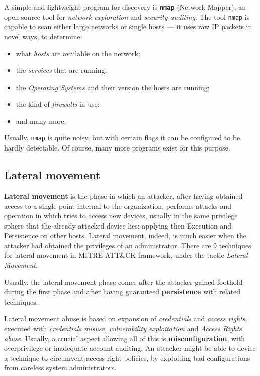\documentclass[10pt]{extreport}
\begin{document}
A simple and lightweight program for discovery is \textbf{\texttt{nmap}}
(Network Mapper), an open source tool for \emph{network exploration} and
\emph{security auditing}. The tool \texttt{nmap} is capable to scan either
large networks or single hosts --- it uses raw IP packets in novel ways, to
determine:
\begin{itemize}
    \item what \emph{hosts} are available on the network;
    \item the \emph{services} that are running;
    \item the \emph{Operating Systems} and their version the hosts are running;
    \item the kind of \emph{firewalls} in use;
    \item and many more.
\end{itemize}

Usually, \texttt{nmap} is quite noisy, but with certain flags it can be
configured to be hardly detectable. Of course, many more programs exist for
this purpose.


\subsection{Lateral movement}

\textbf{Lateral movement} is the phase in which an attacker, after having
obtained access to a single point internal to the organization, performs
attacks and operation in which tries to access new devices, usually in the same
privilege sphere that the already attacked device lies; applying then Execution
and Persistence on other hosts. Lateral movement, indeed, is much easier when
the attacker had obtained the privileges of an administrator. There are 9
techniques for lateral movement in MITRE ATT\&CK framework, under the tactic
\emph{Lateral Movement}.

Usually, the lateral movement phase comes after the attacker gained foothold
during the first phase and after having guaranteed \textbf{persistence} with
related techniques.

Lateral movement abuse is based on expansion of \emph{credentials} and
\emph{access rights}, executed with \emph{credentials misuse},
\emph{vulnerability exploitation} and \emph{Access Rights abuse}. Usually, a
crucial aspect allowing all of this is \textbf{misconfiguration}, with
overprivilege or inadequate account auditing. An attacker might be able to
devise a technique to circumvent access right policies, by exploiting bad
configurations from careless system administrators.
\end{document}
